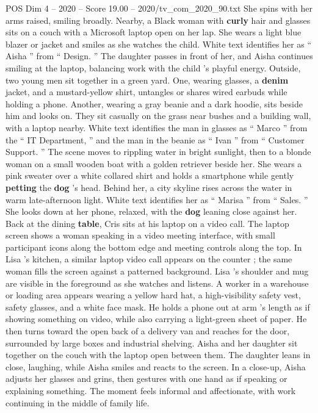 \begin{textsample}{POS Dim 4 – 2020 – Score 19.00 – 2020/tv\_com\_2020\_90.txt}
She spins with her arms raised, smiling broadly.
Nearby, a Black woman with \textbf{curly} hair and glasses sits on a couch with a Microsoft laptop open on her lap.
She wears a light blue blazer or jacket and smiles as she watches the child.
White text identifies her as “ Aisha ” from “ Design. ” The daughter passes in front of her, and Aisha continues smiling at the laptop, balancing work with the child ’s playful energy.
Outside, two young men sit together in a green yard.
One, wearing glasses, a \textbf{denim} jacket, and a mustard-yellow shirt, untangles or shares wired earbuds while holding a phone.
Another, wearing a gray beanie and a dark hoodie, sits beside him and looks on.
They sit casually on the grass near bushes and a building wall, with a laptop nearby.
White text identifies the man in glasses as “ Marco ” from the “ IT Department, ” and the man in the beanie as “ Ivan ” from “ Customer Support. ” The scene moves to rippling water in bright sunlight, then to a blonde woman on a small wooden boat with a golden retriever beside her.
She wears a pink sweater over a white collared shirt and holds a smartphone while gently \textbf{petting} the \textbf{dog} ’s head.
Behind her, a city skyline rises across the water in warm late-afternoon light.
White text identifies her as “ Marisa ” from “ Sales. ” She looks down at her phone, relaxed, with the \textbf{dog} leaning close against her.
Back at the dining \textbf{table}, Cris sits at his laptop on a video call.
The laptop screen shows a woman speaking in a video meeting interface, with small participant icons along the bottom edge and meeting controls along the top.
In Lisa ’s kitchen, a similar laptop video call appears on the counter ; the same woman fills the screen against a patterned background.
Lisa ’s shoulder and mug are visible in the foreground as she watches and listens.
A worker in a warehouse or loading area appears wearing a yellow hard hat, a high-visibility safety vest, safety glasses, and a white face mask.
He holds a phone out at arm ’s length as if showing something on video, while also carrying a light-green sheet of paper.
He then turns toward the open back of a delivery van and reaches for the door, surrounded by large boxes and industrial shelving.
Aisha and her daughter sit together on the couch with the laptop open between them.
The daughter leans in close, laughing, while Aisha smiles and reacts to the screen.
In a close-up, Aisha adjusts her glasses and grins, then gestures with one hand as if speaking or explaining something.
The moment feels informal and affectionate, with work continuing in the middle of family life.

\end{textsample}
